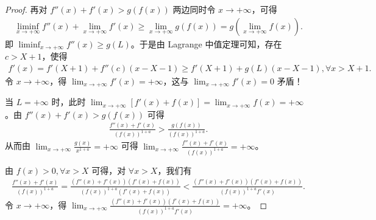\documentclass[../../main.tex]{subfiles}%
\begin{document}
\begin{proof}
再对 \( f''(x) + f'(x) > g(f(x)) \) 两边同时令 \( x \to +\infty \)，可得
\begin{align*}
\liminf_{x \to +\infty} f''(x) + \lim_{x \to +\infty} f'(x) \geqslant  \lim_{x \to +\infty} g(f(x)) = g\left( \lim_{x \to +\infty} f(x) \right).
\end{align*}
即 \( \liminf_{x \to +\infty} f''(x) \geqslant  g(L) \)。于是由 Lagrange 中值定理可知，存在 \( c > X + 1 \)，使得
\begin{align*}
f'(x) = f'(X + 1) + f''(c) (x - X - 1) \geqslant  f'(X + 1) + g(L) (x - X - 1), \forall x > X + 1.
\end{align*}
令 \( x \to +\infty \)，得 \( \lim_{x \to +\infty} f'(x) = +\infty \)，这与 \( \lim_{x \to +\infty} f'(x) = 0 \) 矛盾！

\two 当 \( L = +\infty \) 时，此时 \( \lim_{x \to +\infty} \left[ f'(x) + f(x) \right] = \lim_{x \to +\infty} f(x) = +\infty \)。由 \( f''(x) + f'(x) > g(f(x)) \) 可得
\begin{align*}
\frac{f''(x) + f'(x)}{\left( f(x) \right)^{1 + a}} > \frac{g(f(x))}{\left( f(x) \right)^{1 + a}} .
\end{align*}
从而由 \( \lim_{x \to +\infty} \frac{g(x)}{x^{1 + a}} = +\infty \) 可得 \( \lim_{x \to +\infty} \frac{f''(x) + f'(x)}{\left( f(x) \right)^{1 + a}} = +\infty \)。

由 \( f(x) > 0, \forall x > X \) 可得，对 \( \forall x > X \)，我们有
\begin{align*}
\frac{f''(x) + f'(x)}{\left( f(x) \right)^{1 + a}} = \frac{\left( f''(x) + f'(x) \right) \left( f'(x) + f(x) \right)}{\left( f(x) \right)^{1 + a} \left( f'(x) + f(x) \right)} < \frac{\left( f''(x) + f'(x) \right) \left( f'(x) + f(x) \right)}{\left( f(x) \right)^{1 + a} f'(x)}.
\end{align*}
令 \( x \to +\infty \)，得 \( \lim_{x \to +\infty} \frac{\left( f''(x) + f'(x) \right) \left( f'(x) + f(x) \right)}{\left( f(x) \right)^{1 + a} f'(x)} = +\infty \)。


\end{proof}
\end{document}
